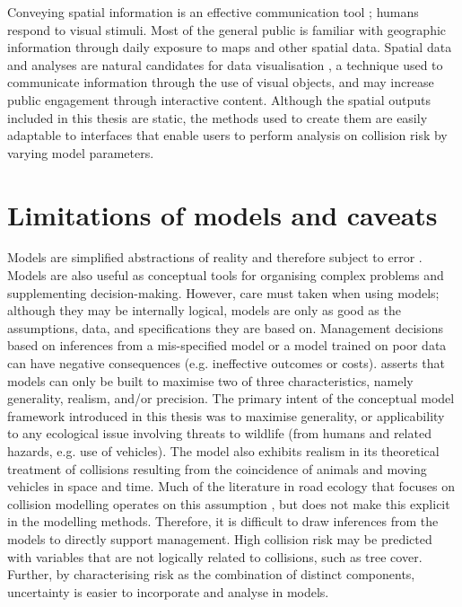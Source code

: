 
Conveying spatial information is an effective communication tool \citep{king00}; humans respond to visual stimuli. Most of the general public is familiar with geographic information through daily exposure to maps and other spatial data. Spatial data and analyses are natural candidates for data visualisation \citep{osul14}, a technique used to communicate information through the use of visual objects, and may increase public engagement through interactive content. Although the spatial outputs included in this thesis are static, the methods used to create them are easily adaptable to interfaces that enable users to perform analysis on collision risk by varying model parameters.

\section{Limitations of models and caveats}

Models are simplified abstractions of reality and therefore subject to error \citep{burg05}. Models are also useful as conceptual tools for organising complex problems and supplementing decision-making. However, care must taken when using models; although they may be internally logical, models are only as good as the assumptions, data, and specifications they are based on. Management decisions based on inferences from a mis-specified model or a model trained on poor data can have negative consequences (e.g. ineffective outcomes or costs). \cite{levi66} asserts that models can only be built to maximise two of three characteristics, namely generality, realism, and/or precision. The primary intent of the conceptual model framework introduced in this thesis was to maximise generality, or applicability to any ecological issue involving threats to wildlife (from humans and related hazards, e.g. use of vehicles). The model also exhibits realism in its theoretical treatment of collisions resulting from the coincidence of animals and moving vehicles in space and time. Much of the literature in road ecology that focuses on collision modelling operates on this assumption \citep{form03,guns11}, but does not make this explicit in the modelling methods. Therefore, it is difficult to draw inferences from the models to directly support management. High collision risk may be predicted with variables that are not logically related to collisions, such as tree cover. Further, by characterising risk as the combination of distinct components, uncertainty is easier to incorporate and analyse in models. 

